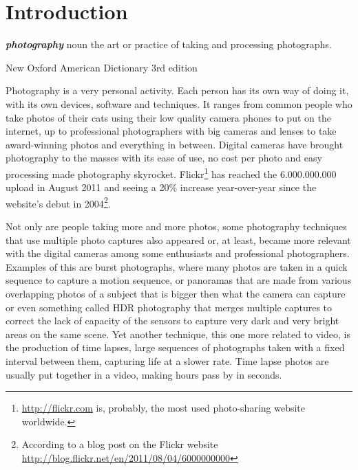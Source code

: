 \chapter{Introduction} %
\label{chapter:introduction}



\setlength{\epigraphwidth}{.5\textwidth}
\setlength{\afterepigraphskip}{\baselineskip}

\epigraph{\emph{\textbf{photography}}\newline
noun\newline
the art or practice of taking and processing photographs.}{\footnotesize New Oxford American Dictionary 3rd edition}

Photography is a very personal activity. Each person has its own way of doing it, with its own devices, software and techniques. It ranges from common people who take photos of their cats using their low quality camera phones to put on the internet, up to professional photographers with big cameras and lenses to take award-winning photos and everything in between. Digital cameras have brought photography to the masses with its ease of use, no cost per photo and easy processing made photography skyrocket. Flickr\footnote{\url{http://flickr.com} is, probably, the most used photo-sharing website worldwide.} has reached the 6.000.000.000 upload in August 2011 and seeing a 20\% increase year-over-year since the website's debut in 2004\footnote{According to a blog post on the Flickr website \url{http://blog.flickr.net/en/2011/08/04/6000000000}}.

Not only are people taking more and more photos, some photography techniques that use multiple photo captures also appeared or, at least, became more relevant with the digital cameras among some enthusiasts and professional photographers. Examples of this are burst photographs, where many photos are taken in a quick sequence to capture a motion sequence, or panoramas that are made from various overlapping photos of a subject that is bigger then what the camera can capture or even something called \acf{HDR} photography that merges multiple captures to correct the lack of capacity of the sensors to capture very dark and very bright areas on the same scene. Yet another technique, this one more related to video, is the production of time lapses, large sequences of photographs taken with a fixed interval between them, capturing life at a slower rate. Time lapse photos are usually put together in a video, making hours pass by in seconds.

